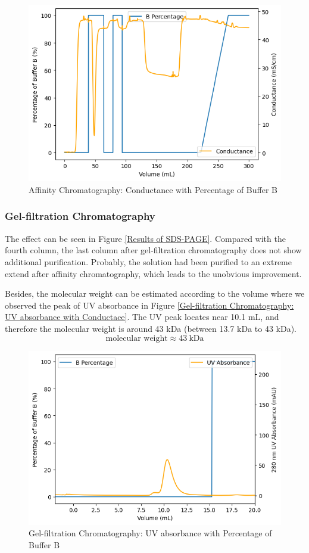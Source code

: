 \documentclass{report}
\begin{document}
\begin{figure}
    \centering
    \includegraphics[width=0.6\linewidth]{../Figures/Affinity Column Conductance.png}
    \caption{Affinity Chromatography: Conductance with Percentage of Buffer B}
    \label{Affinity Chromatography: Conductance}
\end{figure}
\subsubsection{Gel-filtration Chromatography}
The effect can be seen in Figure \ref{Results of SDS-PAGE}.
Compared with the fourth column, the last column after gel-filtration chromatography does not show additional purification.
Probably, the solution had been purified to an extreme extend after affinity chromatography, which leads to the unobvious improvement.

Besides, the molecular weight can be estimated according to the volume where we observed the peak of UV absorbance in Figure \ref{Gel-filtration Chromatography: UV absorbance with Conductace}.
The UV peak locates near 10.1 mL, and therefore the molecular weight is around 43 kDa (between 13.7 kDa to 43 kDa).
$$
\text{molecular weight}\approx 43 \ \text{kDa}
$$
\begin{figure}
    \centering
    \includegraphics[width=0.6\linewidth]{../Figures/Filtration Column UV.png}
    \caption{Gel-filtration Chromatography: UV absorbance with Percentage of Buffer B}
    \label{Gel-filtration Chromatography: UV absorbance with Percentage of Buffer B}
\end{figure}
\end{document}
